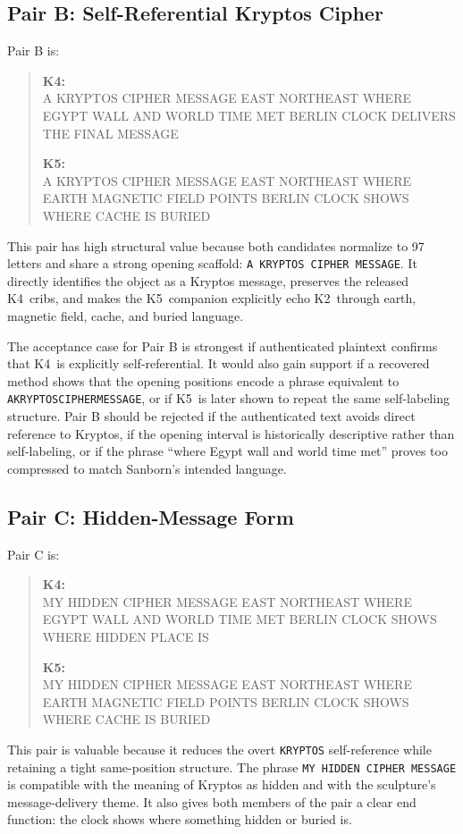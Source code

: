 \documentclass[12pt]{paperFormatting}
\newcommand{\Kfour}{K4}
\newcommand{\Kfive}{K5}
\newcommand{\Ktwo}{K2}
\begin{document}
\begin{thesisbody}
\subsection{Pair B: Self-Referential Kryptos Cipher}
Pair B is:
\begin{quote}
\footnotesize\raggedright
\textbf{\Kfour:}\\
A KRYPTOS CIPHER MESSAGE EAST NORTHEAST WHERE EGYPT WALL AND WORLD TIME MET BERLIN CLOCK DELIVERS THE FINAL MESSAGE

\textbf{\Kfive:}\\
A KRYPTOS CIPHER MESSAGE EAST NORTHEAST WHERE EARTH MAGNETIC FIELD POINTS BERLIN CLOCK SHOWS WHERE CACHE IS BURIED
\end{quote}
This pair has high structural value because both candidates normalize to 97 letters and share a strong opening scaffold: \texttt{A KRYPTOS CIPHER MESSAGE}. It directly identifies the object as a Kryptos message, preserves the released \Kfour\ cribs, and makes the \Kfive\ companion explicitly echo \Ktwo\ through earth, magnetic field, cache, and buried language.

The acceptance case for Pair B is strongest if authenticated plaintext confirms that \Kfour\ is explicitly self-referential. It would also gain support if a recovered method shows that the opening positions encode a phrase equivalent to \texttt{AKRYPTOSCIPHERMESSAGE}, or if \Kfive\ is later shown to repeat the same self-labeling structure. Pair B should be rejected if the authenticated text avoids direct reference to Kryptos, if the opening interval is historically descriptive rather than self-labeling, or if the phrase ``where Egypt wall and world time met'' proves too compressed to match Sanborn's intended language.

\subsection{Pair C: Hidden-Message Form}
Pair C is:
\begin{quote}
\footnotesize\raggedright
\textbf{\Kfour:}\\
MY HIDDEN CIPHER MESSAGE EAST NORTHEAST WHERE EGYPT WALL AND WORLD TIME MET BERLIN CLOCK SHOWS WHERE HIDDEN PLACE IS

\textbf{\Kfive:}\\
MY HIDDEN CIPHER MESSAGE EAST NORTHEAST WHERE EARTH MAGNETIC FIELD POINTS BERLIN CLOCK SHOWS WHERE CACHE IS BURIED
\end{quote}
This pair is valuable because it reduces the overt \texttt{KRYPTOS} self-reference while retaining a tight same-position structure. The phrase \texttt{MY HIDDEN CIPHER MESSAGE} is compatible with the meaning of Kryptos as hidden and with the sculpture's message-delivery theme. It also gives both members of the pair a clear end function: the clock shows where something hidden or buried is.


\end{thesisbody}
\end{document}
